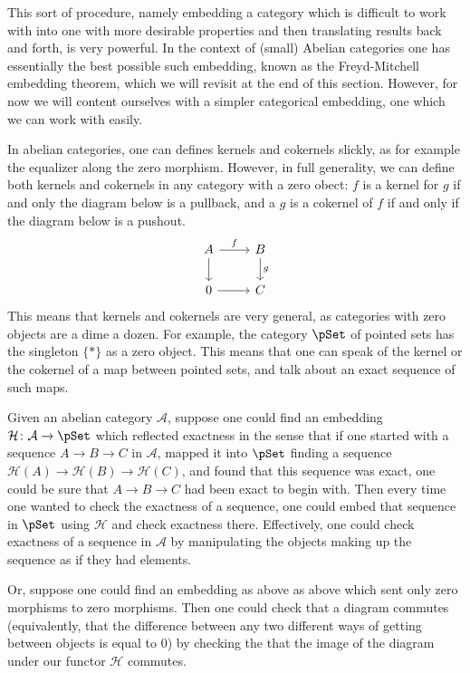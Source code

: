 \documentclass[main.tex]{subfiles}
\begin{document}
This sort of procedure, namely embedding a category which is difficult to work with into one with more desirable properties and then translating results back and forth, is very powerful. In the context of (small) Abelian categories one has essentially the best possible such embedding, known as the Freyd-Mitchell embedding theorem, which we will revisit at the end of this section. However, for now we will content ourselves with a simpler categorical embedding, one which we can work with easily.

In abelian categories, one can defines kernels and cokernels slickly, as for example the equalizer along the zero morphism. However, in full generality, we can define both kernels and cokernels in any category with a zero obect: $f$ is a kernel for $g$ if and only the diagram below is a pullback, and a $g$ is a cokernel of $f$ if and only if the diagram below is a pushout.
\begin{equation*}
  \begin{tikzcd}
    A
    \arrow[r, "f"]
    \arrow[d]
    & B
    \arrow[d, "g"]
    \\
    0
    \arrow[r]
    & C
  \end{tikzcd}
\end{equation*}
This means that kernels and cokernels are very general, as categories with zero objects are a dime a dozen. For example, the category $\pSet$ of pointed sets has the singleton $\{*\}$ as a zero object. This means that one can speak of the kernel or the cokernel of a map between pointed sets, and talk about an exact sequence of such maps.

Given an abelian category $\mathcal{A}$, suppose one could find an embedding $\mathcal{H}\colon \mathcal{A} \to \pSet$ which reflected exactness in the sense that if one started with a sequence $A \to B \to C$ in $\mathcal{A}$, mapped it into $\pSet$ finding a sequence $\mathcal{H}(A) \to \mathcal{H}(B) \to \mathcal{H}(C)$, and found that this sequence was exact, one could be sure that $A \to B \to C$ had been exact to begin with. Then every time one wanted to check the exactness of a sequence, one could embed that sequence in $\pSet$ using $\mathcal{H}$ and check exactness there. Effectively, one could check exactness of a sequence in $\mathcal{A}$ by manipulating the objects making up the sequence as if they had elements.

Or, suppose one could find an embedding as above as above which sent only zero morphisms to zero morphisms. Then one could check that a diagram commutes (equivalently, that the difference between any two different ways of getting between objects is equal to $0$) by checking the that the image of the diagram under our functor $\mathcal{H}$ commutes.
\end{document}
